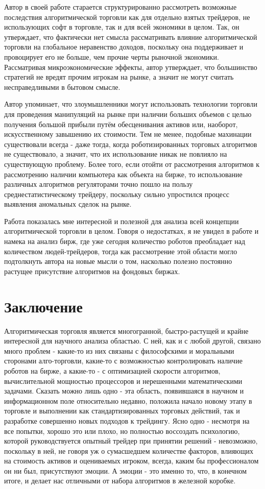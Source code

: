 \documentclass[a4paper,14pt]{extarticle}
\begin{document}
Автор в своей работе старается структурированно рассмотреть возможные последствия алгоритмической торговли как для отдельно взятых трейдеров, не использующих софт в торговле, так и для всей экономики в целом. Так, он утверждает, что фактически нет смысла рассматривать влияние алгоритмической торговли на глобальное неравенство доходов, поскольку она поддерживает и провоцирует его не больше, чем прочие черты рыночной экономики. Рассматривая микроэкономические эффекты, автор утверждает, что большинство стратегий не вредят прочим игрокам на рынке, а значит не могут считать несправедливыми в бытовом смысле. 

Автор упоминает, что злоумышленники могут использовать технологии торговли для проведения манипуляций на рынке при наличии больших объемов с целью получения большой прибыли путём обесценивания активов или, наоборот, искусственному завышению их стоимости. Тем не менее, подобные махинации существовали всегда - даже тогда, когда роботизированных торговых алгоритмов не существовало, а значит, что их использование никак не повлияло на существующую проблему. Более того, если отойти от рассмотрения алгоритмов к рассмотрению наличии компьютера как объекта на бирже, то использование различных алгоритмов регуляторами точно пошло на пользу среднестатистическому трейдеру, поскольку сильно упростился процесс выявления аномальных сделок на рынке.

Работа показалась мне интересной и полезной для анализа всей концепции алгоритмической торговли в целом. Говоря о недостатках, я не увидел в работе и намека на анализ бирж, где уже сегодня количество роботов преобладает над количеством людей-трейдеров, тогда как рассмотрение этой области могло подтолкнуть автора на новые мысли о том, насколько полезно постоянно растущее присутствие алгоритмов на фондовых биржах.

\newpage

\section{Заключение}

Алгоритмическая торговля является многогранной, быстро-растущей и крайне интересной для научного анализа областью. С ней, как и с любой другой, связано много проблем -  какие-то из них связаны с философскими и моральными сторонами алго-торговли, какие-то с возможностью контролировать наличие роботов на бирже, а какие-то - с оптимизацией скорости алгоритмов, вычислительной мощностью процессоров и нерешенными математическими задачами. Сказать можно лишь одно - эта область, появившаяся в научном и информационном поле относительно недавно, положила начало новому этапу в торговле и выполнении как стандартизированных торговых действий, так и разработке совершенно новых подходов к трейдингу. Ясно одно - несмотря на все попытки, хорошо это или плохо, но полностью воссоздать психологию, которой руководствуется опытный трейдер при принятии решений - невозможно, поскольку в ней, не говоря уж о сумасшедшем количестве факторов, влияющих на стоимость активов и оцениваемых игроком, всегда, каким бы профессионалом он ни был, присутствуют эмоции. А эмоции - это именно то, что, в конечном итоге, и делает нас отличными от набора алгоритмов в железной коробке. 
\end{document}
